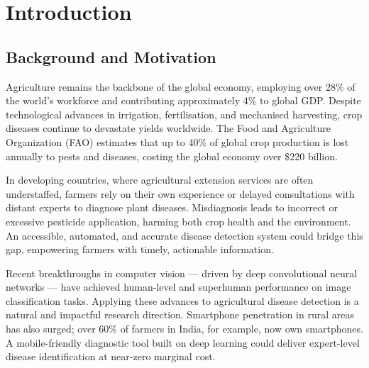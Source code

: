 \documentclass[11pt,a4paper]{article}
\newcommand{\parsp}{\medskip}
\begin{document}
\listoffigures
{}
\newpage

\listoftables
{}
\newpage


\section{Introduction}

\subsection{Background and Motivation}

Agriculture remains the backbone of the global economy, employing over 28\%
of the world's workforce and contributing approximately 4\% to global GDP.
Despite technological advances in irrigation, fertilisation, and mechanised
harvesting, crop diseases continue to devastate yields worldwide. The Food
and Agriculture Organization (FAO) estimates that up to 40\% of global crop
production is lost annually to pests and diseases, costing the global economy
over \$220 billion.

\parsp
In developing countries, where agricultural extension services are often
understaffed, farmers rely on their own experience or delayed consultations
with distant experts to diagnose plant diseases. Misdiagnosis leads to
incorrect or excessive pesticide application, harming both crop health and
the environment. An accessible, automated, and accurate disease detection
system could bridge this gap, empowering farmers with timely, actionable
information.

\parsp
Recent breakthroughs in computer vision — driven by deep convolutional neural
networks — have achieved human-level and superhuman performance on image
classification tasks. Applying these advances to agricultural disease
detection is a natural and impactful research direction. Smartphone
penetration in rural areas has also surged; over 60\% of farmers in India,
for example, now own smartphones. A mobile-friendly diagnostic tool built on
deep learning could deliver expert-level disease identification at
near-zero marginal cost.
\end{document}

